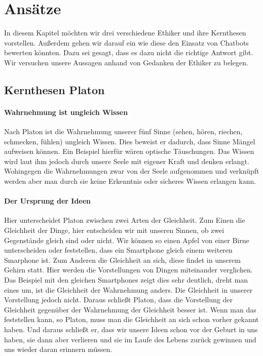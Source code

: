 \section{Ansätze}
In diesem Kapitel möchten wir drei verschiedene Ethiker und ihre Kernthesen vorstellen. Außerdem gehen wir darauf ein wie diese den Einsatz von Chatbots bewerten könnten. Dazu sei gesagt, dass es dazu nicht die richtige Antwort gibt. Wir versuchen unsere Aussagen anhand von Gedanken der Ethiker zu belegen. 

\subsection{Kernthesen Platon}

\paragraph{Wahrnehmung ist ungleich Wissen} 
Nach Platon ist die Wahrnehmung unserer fünf Sinne (sehen, hören, riechen, schmecken, fühlen) ungleich Wissen. Dies beweist er dadurch, dass Sinne Mängel aufweisen können. Ein Beispiel hierfür wären optische Täuschungen. Das Wissen wird laut ihm jedoch durch unsere Seele mit eigener Kraft  und denken erlangt. Wohingegen die Wahrnehmungen zwar von der Seele aufgenommen und verknüpft werden aber man durch sie keine Erkenntnis oder sicheres Wissen  erlangen kann.

\paragraph{Der Ursprung der Ideen} 
Hier unterscheidet Platon zwischen zwei Arten der Gleichheit.\newline
Zum Einen die Gleichheit der Dinge, hier entscheiden wir mit unseren Sinnen, ob zwei Gegenstände gleich sind oder nicht. Wir können so einen Apfel von einer Birne unterscheiden oder feststellen, dass ein Smartphone gleich einem weiteren Smarphone ist.\newline
Zum Anderen die Gleichheit an sich, diese findet in unserem Gehirn statt. Hier werden die Vorstellungen von Dingen miteinander verglichen.\newline
Das Beispiel mit den gleichen Smartphones zeigt dies sehr deutlich, dreht man eines um, ist die Gleichheit der Wahrnehmung anders. Die Gleichheit in unserer Vorstellung jedoch nicht. Daraus schließt Platon, dass die Vorstellung der Gleichheit gegenüber der Wahrnehmung der Gleichheit besser ist. Wenn man das feststellen kann, so Platon, muss man die Gleichheit an sich schon vorher gekannt haben. Und daraus schließt er, dass wir unsere Ideen schon vor der Geburt in uns haben, sie dann aber verlieren und sie im Laufe des Lebens zurück gewinnen und uns wieder daran erinnern müssen.

